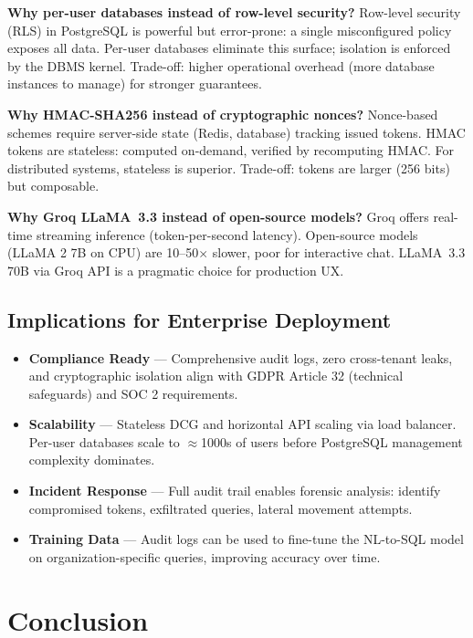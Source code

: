 \documentclass[conference]{IEEEtran}
\begin{document}
\textbf{Why per-user databases instead of row-level security?}
Row-level security (RLS) in PostgreSQL is powerful but error-prone: a single misconfigured policy exposes all data. Per-user databases eliminate this surface; isolation is enforced by the DBMS kernel. Trade-off: higher operational overhead (more database instances to manage) for stronger guarantees.

\textbf{Why HMAC-SHA256 instead of cryptographic nonces?}
Nonce-based schemes require server-side state (Redis, database) tracking issued tokens. HMAC tokens are stateless: computed on-demand, verified by recomputing HMAC. For distributed systems, stateless is superior. Trade-off: tokens are larger (256 bits) but composable.

\textbf{Why Groq LLaMA~3.3 instead of open-source models?}
Groq offers real-time streaming inference (token-per-second latency). Open-source models (LLaMA 2 7B on CPU) are 10--50$\times$ slower, poor for interactive chat. LLaMA~3.3 70B via Groq API is a pragmatic choice for production UX.

\subsection{Implications for Enterprise Deployment}
\begin{itemize}
  \item \textbf{Compliance Ready} --- Comprehensive audit logs, zero cross-tenant leaks, and cryptographic isolation align with GDPR Article 32 (technical safeguards) and SOC 2 requirements.
  \item \textbf{Scalability} --- Stateless DCG and horizontal API scaling via load balancer. Per-user databases scale to $\approx$1000s of users before PostgreSQL management complexity dominates.
  \item \textbf{Incident Response} --- Full audit trail enables forensic analysis: identify compromised tokens, exfiltrated queries, lateral movement attempts.
  \item \textbf{Training Data} --- Audit logs can be used to fine-tune the NL-to-SQL model on organization-specific queries, improving accuracy over time.
\end{itemize}

\section{Conclusion}
\end{document}
